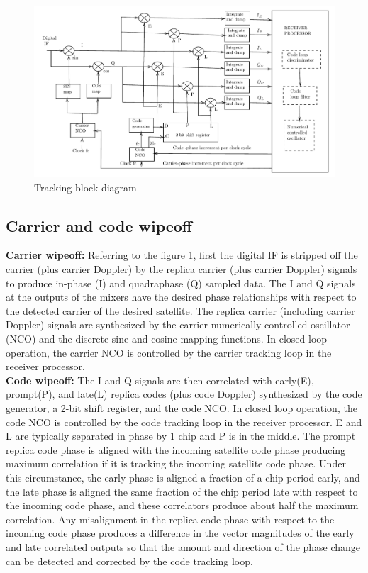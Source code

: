 \begin{normalsize}
\begin{figure}[ht]
\centering
\includegraphics[width=1\columnwidth]{figs/block3}
\centering
\captionsetup{justification=centering}
\caption{Tracking block diagram}
\label{fig:tracking}
\end{figure}
\end{normalsize}
\subsection{Carrier and code wipeoff}
\textbf{Carrier wipeoff: }Referring to the figure \ref{fig:tracking}, first the digital IF is stripped off the carrier (plus carrier Doppler) by the replica carrier (plus carrier Doppler) signals to produce in-phase (I) and quadraphase (Q) sampled data. The I and Q signals at the outputs of the mixers have the desired phase relationships with respect to the detected carrier of the desired satellite. The replica carrier (including carrier Doppler) signals are synthesized by the carrier numerically controlled oscillator (NCO) and the discrete sine and cosine mapping functions. In closed loop operation, the carrier NCO is controlled by the carrier tracking loop in the receiver processor.
\\
\textbf{Code wipeoff: } The I and Q signals are then correlated with early(E), prompt(P), and late(L) replica codes (plus code Doppler) synthesized by the code generator, a 2-bit shift register, and the code NCO. In closed loop operation, the code NCO is controlled by the code tracking loop in the receiver processor. E and L are typically separated in phase by 1 chip and P is in the middle. The prompt replica code phase is aligned with the incoming satellite code phase producing maximum correlation if it is tracking the incoming satellite code phase. Under this circumstance, the early phase is aligned a fraction of a chip period early, and the late phase is aligned the same fraction of the chip period late with respect to the incoming  code phase, and these correlators produce about half the maximum correlation. Any misalignment in the replica code phase with respect to the incoming code phase produces a difference in the vector magnitudes of the early and late correlated outputs so that the amount and direction of the phase change can be detected and corrected by the code tracking loop.
